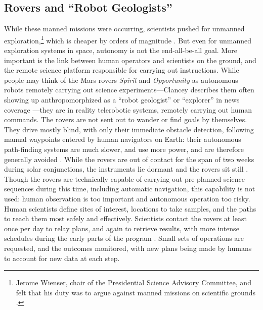 \subsection{Rovers and ``Robot Geologists''}

 While these manned missions were occurring, scientists
 pushed for unmanned exploration,\footnote{Jerome
 Wienser, chair of the Presidential Science
   Advisory Committee, and felt that his duty was to argue against
   manned missions on scientific grounds \cite[Chapter 2]{Levine}.}
 which is cheaper by orders of magnitude
 \cite[p. 66]{coxMurray}. But even for
unmanned exploration systems in space, autonomy is not the
end-all-be-all goal. More important is the link between human
operators and scientists on the ground, and the remote science
platform responsible for carrying out instructions. 
While people may
think of the Mars rovers \emph{Spirit} and \emph{Opportunity} as
autonomous robots remotely carrying out science experiments---Clancey
describes them often showing up anthropomorphized as a ``robot 
geologist'' or 
``explorer'' in news coverage \cite[p. 7]{clancey}---they are
in reality telerobotic systems, remotely carrying out human commands.
The rovers are not 
sent out to wander or find goals by themselves. They drive mostly
blind, with only their immediate obstacle detection, following manual
waypoints entered by human navigators on Earth: their autonomous
path-finding systems are much slower, and use more power, and are
therefore generally avoided \cite[p. 118]{clancey}. While the rovers
are out of contact for the span of two weeks during solar
conjunctions, the instruments lie dormant and the rovers sit
still \cite[p. 25]{clancey}. Though the rovers are technically capable of
carrying out pre-planned science sequences during this time, including
automatic navigation, this capability is not used: human observation
is too important and
autonomous operation too risky. Human
scientists define sites of interest, locations to take samples, and
the paths to reach them most safely and effectively. Scientists
contact the rovers at least once per day to relay plans, and again
to retrieve results, with more intense schedules during the early
parts of the program \cite[p. 58]{clancey}. Small sets of
operations are requested, and the outcomes monitored, with new plans
being made by humans to account for new data at each step.

